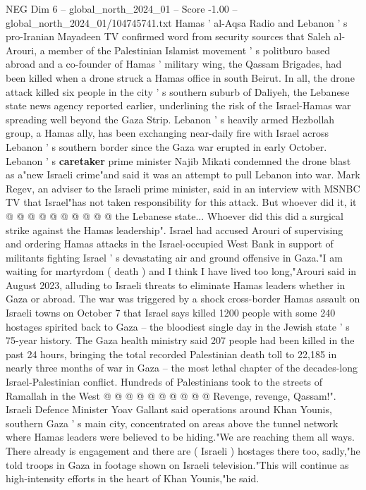 \begin{textsample}{NEG Dim 6 – global\_north\_2024\_01 – Score -1.00 – global\_north\_2024\_01/104745741.txt}  \label{ex:f6_neg_326}
Hamas ' al-Aqsa Radio and Lebanon ' s pro-Iranian Mayadeen TV confirmed word from security sources that Saleh al-Arouri, a member of the Palestinian Islamist movement ' s politburo based abroad and a co-founder of Hamas ' military wing, the Qassam Brigades, had been killed when a drone struck a Hamas office in south Beirut.
In all, the drone attack killed six people in the city ' s southern suburb of Daliyeh, the Lebanese state news agency reported earlier, underlining the risk of the Israel-Hamas war spreading well beyond the Gaza Strip.
Lebanon ' s heavily armed Hezbollah group, a Hamas ally, has been exchanging near-daily fire with Israel across Lebanon ' s southern border since the Gaza war erupted in early October.
Lebanon ' s \textbf{caretaker} prime minister Najib Mikati condemned the drone blast as a"new Israeli crime"and said it was an attempt to pull Lebanon into war.
Mark Regev, an adviser to the Israeli prime minister, said in an interview with MSNBC TV that Israel"has not taken responsibility for this attack.
But whoever did it, it @ @ @ @ @ @ @ @ @ @ the Lebanese state...
Whoever did this did a surgical strike against the Hamas leadership".
Israel had accused Arouri of supervising and ordering Hamas attacks in the Israel-occupied West Bank in support of militants fighting Israel ' s devastating air and ground offensive in Gaza."I am waiting for martyrdom ( death ) and I think I have lived too long,"Arouri said in August 2023, alluding to Israeli threats to eliminate Hamas leaders whether in Gaza or abroad.
The war was triggered by a shock cross-border Hamas assault on Israeli towns on October 7 that Israel says killed 1200 people with some 240 hostages spirited back to Gaza -- the bloodiest single day in the Jewish state ' s 75-year history.
The Gaza health ministry said 207 people had been killed in the past 24 hours, bringing the total recorded Palestinian death toll to 22,185 in nearly three months of war in Gaza -- the most lethal chapter of the decades-long Israel-Palestinian conflict.
Hundreds of Palestinians took to the streets of Ramallah in the West @ @ @ @ @ @ @ @ @ @ Revenge, revenge, Qassam!".
Israeli Defence Minister Yoav Gallant said operations around Khan Younis, southern Gaza ' s main city, concentrated on areas above the tunnel network where Hamas leaders were believed to be hiding."We are reaching them all ways.
There already is engagement and there are ( Israeli ) hostages there too, sadly,"he told troops in Gaza in footage shown on Israeli television."This will continue as high-intensity efforts in the heart of Khan Younis,"he said.

\end{textsample}
